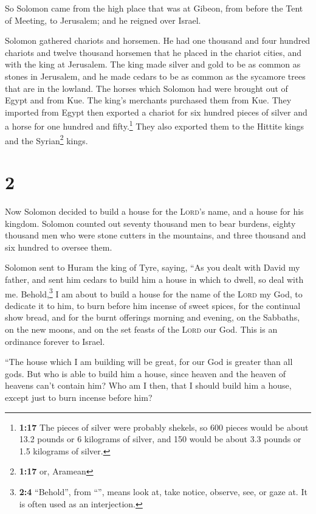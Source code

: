  So Solomon came from the high place that was at Gibeon,
from before the Tent of Meeting, to Jerusalem; and he reigned over
Israel.

 Solomon gathered chariots and horsemen. He had one
thousand and four hundred chariots and twelve thousand horsemen that he
placed in the chariot cities, and with the king at Jerusalem.
 The king made silver and gold to be as common as stones
in Jerusalem, and he made cedars to be as common as the sycamore trees
that are in the lowland.  The horses which Solomon had
were brought out of Egypt and from Kue. The king's merchants purchased
them from Kue.  They imported from Egypt then exported a
chariot for six hundred pieces of silver and a horse for one hundred and
fifty.\footnote{\textbf{1:17} The pieces of silver were probably
  shekels, so 600 pieces would be about 13.2 pounds or 6 kilograms of
  silver, and 150 would be about 3.3 pounds or 1.5 kilograms of silver.}
They also exported them to the Hittite kings and the Syrian\footnote{\textbf{1:17}
  or, Aramean} kings.

\hypertarget{section-1}{%
\section{2}\label{section-1}}

 Now Solomon decided to build a house for the
\textsc{Lord}'s name, and a house for his kingdom. 
Solomon counted out seventy thousand men to bear burdens, eighty
thousand men who were stone cutters in the mountains, and three thousand
and six hundred to oversee them.

 Solomon sent to Huram the king of Tyre, saying, ``As you
dealt with David my father, and sent him cedars to build him a house in
which to dwell, so deal with me.  Behold,\footnote{\textbf{2:4}
  ``Behold'', from ``'', means look at, take notice,
  observe, see, or gaze at. It is often used as an interjection.} I am
about to build a house for the name of the \textsc{Lord} my God, to
dedicate it to him, to burn before him incense of sweet spices, for the
continual show bread, and for the burnt offerings morning and evening,
on the Sabbaths, on the new moons, and on the set feasts of the
\textsc{Lord} our God. This is an ordinance forever to Israel.

 ``The house which I am building will be great, for our
God is greater than all gods.  But who is able to build
him a house, since heaven and the heaven of heavens can't contain him?
Who am I then, that I should build him a house, except just to burn
incense before him?

